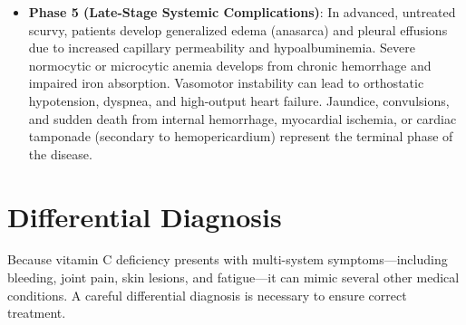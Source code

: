 \begin{itemize}
    \item \textbf{Phase 5 (Late-Stage Systemic Complications)}: In advanced, untreated scurvy, patients develop generalized edema (anasarca) and pleural effusions due to increased capillary permeability and hypoalbuminemia. Severe normocytic or microcytic anemia develops from chronic hemorrhage and impaired iron absorption. Vasomotor instability can lead to orthostatic hypotension, dyspnea, and high-output heart failure. Jaundice, convulsions, and sudden death from internal hemorrhage, myocardial ischemia, or cardiac tamponade (secondary to hemopericardium) represent the terminal phase of the disease.
\end{itemize}

\section*{Differential Diagnosis}
Because vitamin C deficiency presents with multi-system symptoms—including bleeding, joint pain, skin lesions, and fatigue—it can mimic several other medical conditions. A careful differential diagnosis is necessary to ensure correct treatment.

